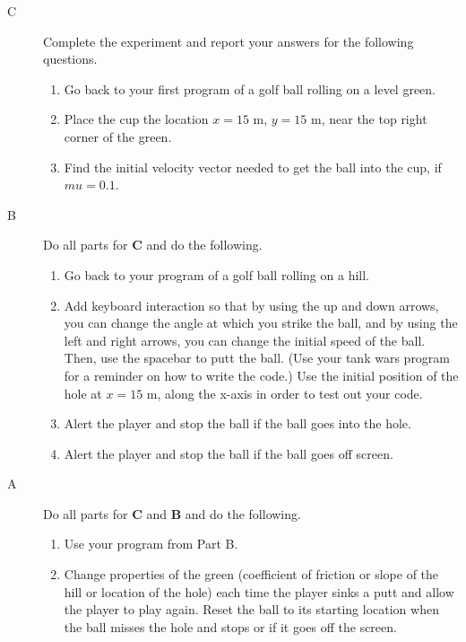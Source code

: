 \begin{description}

\item[C]  Complete the experiment and report your answers for the following questions.

\begin{enumerate}
	 \item Go back to your first program of a golf ball rolling on a level green.
	 \item Place the cup the location $x=15$ m, $y=15$ m, near the top right corner of the green.
	 \item Find the initial velocity vector needed to get the ball into the cup, if $mu=0.1$.
\end{enumerate}

\item[B] Do all parts for {\bf C} and do the following.

\begin{enumerate}
	\item Go back to your program of a golf ball rolling on a hill.
	\item Add keyboard interaction so that by using the up and down arrows, you can change the angle at which you strike the ball, and by using the left and right arrows, you can change the initial speed of the ball. Then, use the spacebar to putt the ball. (Use your tank wars program for a reminder on how to write the code.) Use the initial position of the hole at $x=15$ m, along the x-axis in order to test out your code.
	\item Alert the player and stop the ball if the ball goes into the hole.
	\item Alert the player and stop the ball if the ball goes off screen.
\end{enumerate}

\item[A] Do all parts for {\bf C} and {\bf B} and do the following.

\begin{enumerate}
	\item Use your program from Part B.
	\item Change properties of the green (coefficient of friction or slope of the hill or location of the hole) each time the player sinks a putt and allow the player to play again. Reset the ball to its starting location when the ball misses the hole and stops or if it goes off the screen.
\end{enumerate}
\end{description}